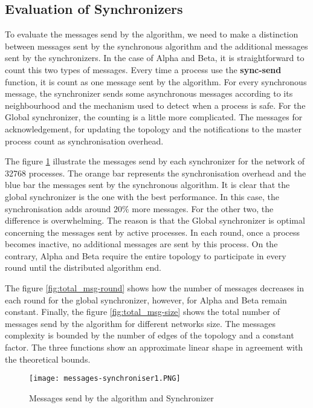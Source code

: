 \FloatBarrier
\subsection{Evaluation of Synchronizers}

To evaluate the messages send by the algorithm, we need to make a distinction between messages sent by the synchronous algorithm and the additional messages sent by the synchronizers. In the case of Alpha and Beta, it is straightforward to count this two types of messages. Every time a process use the \textbf{sync-send} function, it is count as one message sent by the algorithm. For every synchronous message, the synchronizer sends some asynchronous messages according to its neighbourhood and the mechanism used to detect when a process is safe. For the Global synchronizer, the counting is a little more complicated. The messages for acknowledgement, for updating the topology and the notifications to the master process count as synchronisation overhead.


The figure \ref{fig:total_msg} illustrate the messages send by each synchronizer for the network of 32768 processes. The orange bar represents the synchronisation overhead and the blue bar the messages sent by the synchronous algorithm. It is clear that the global synchronizer is the one with the best performance. In this case, the synchronisation adds around $20 \%$ more messages. For the other two, the difference is overwhelming. The reason is that the Global synchronizer is optimal concerning the messages sent by active processes. In each round, once a process becomes inactive, no additional messages are sent by this process. On the contrary, Alpha and Beta require the entire topology to participate in every round until the distributed algorithm end.  

The figure \ref{fig:total_msg-round} shows how the number of messages decreases in each round for the global synchronizer, however, for Alpha and Beta remain constant. Finally, the figure \ref{fig:total_msg-size} shows the total number of messages send by the algorithm for different networks size. The messages complexity is bounded by the number of edges of the topology and a constant factor. The three functions show an approximate linear shape in agreement with the theoretical bounds.

\begin{figure}[ht]
\centering
\texttt{[image: messages-synchroniser1.PNG]} 
\caption{Messages send by the algorithm and Synchronizer}
\label{fig:total_msg}
\end{figure}


